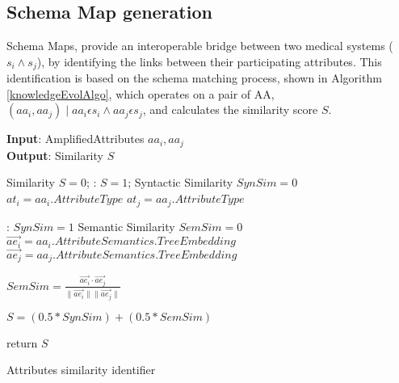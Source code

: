 \subsection*{Schema Map generation}
\label{schema_map_gen}
Schema Maps, provide an interoperable bridge between two medical systems ($s_i \wedge s_j$), by identifying the links between their participating attributes. This identification is based on the schema matching process, shown in Algorithm \ref{knowledgeEvolAlgo}, which operates on a pair of AA, $\left ( aa_i,aa_j \right ) \mid aa_i \epsilon s_i \wedge aa_j \epsilon s_j$, and calculates the similarity score $S$.


\begin{algorithm}
	\textbf{Input}: AmplifiedAttributes $ aa_i, aa_j$ \\
	\textbf{Output}: Similarity $S$ 
	\begin{algorithmic}[1]
		\State Similarity $S = 0$;
		:
		\State $S = 1$;
		\Else
		\State Syntactic Similarity $SynSim = 0 $
		\State $at_i = aa_i.AttributeType$
		\State $at_j = aa_j.AttributeType$
		
		: 
		\State	$SynSim = 1$
		\EndIf
		\State Semantic Similarity $SemSim = 0 $
		\State $\vec{ae_i} =  aa_i.Attribute Semantics
		.TreeEmbedding$
		\State $\vec{ae_j} =  aa_j.Attribute Semantics
		.TreeEmbedding$
		
		\State $SemSim = \frac{\vec{ae_i} \cdot \vec{ae_j}}{\|\vec{ae_i}\|\|\vec{ae_j}\|}$
		
		\State $S = (0.5 * SynSim) + (0.5 * SemSim) $
		\EndIf
		
		\State return $S$
		\caption{Attributes similarity identifier}
		\label{knowledgeEvolAlgo}
	\end{algorithmic}
\end{algorithm}

